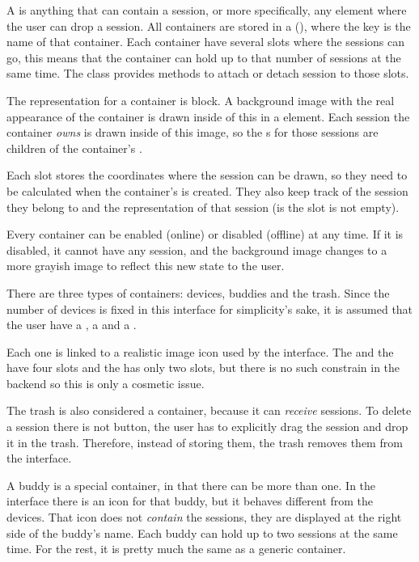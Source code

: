 A  is anything that can contain a session, or more specifically, any element where the user can drop a session.
All containers are stored in a  (), where the key is the name of that container.
Each container have several slots where the sessions can go, this means that the container can hold up to that number of sessions at the same time.
The class provides methods to attach or detach session to those slots.

The  representation for a container is  block.
A background image with the real appearance of the container is drawn inside of this  in a  element.
Each session the container \emph{owns} is drawn inside of this image, so the s for those sessions are children of the container's .

Each slot stores the coordinates where the session can be drawn, so they need to be calculated when the container's  is created.
They also keep track of the session they belong to and the  representation of that session (is the slot is not empty).

Every container can be enabled (online) or disabled (offline) at any time.
If it is disabled, it cannot have any session, and the background image changes to a more grayish image to reflect this new state to the user.

There are three types of containers: devices, buddies and the trash.
Since the number of devices is fixed in this interface for simplicity's sake, it is assumed that the user have a , a  and a .

Each one is linked to a realistic image icon used by the interface.
The  and the  have four slots and the  has only two slots, but there is no such constrain in the backend so this is only a cosmetic issue.

The trash is also considered a container, because it can \emph{receive} sessions.
To delete a session there is not button, the user has to explicitly drag the session and drop it in the trash.
Therefore, instead of storing them, the trash removes them from the interface.

A buddy is a special container, in that there can be more than one.
In the interface there is an icon for that buddy, but it behaves different from the devices.
That icon does not \emph{contain} the sessions, they are displayed at the right side of the buddy's name.
Each buddy can hold up to two sessions at the same time.
For the rest, it is pretty much the same as a generic container.

